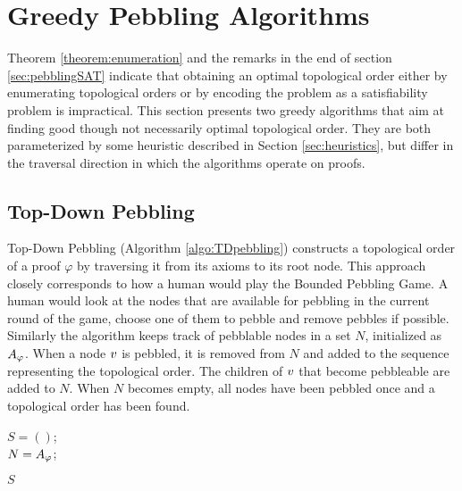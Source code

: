 \section{Greedy Pebbling Algorithms}
\label{sec:algorithms}

Theorem \ref{theorem:enumeration} and the remarks in the end of section \ref{sec:pebblingSAT} indicate that obtaining an optimal topological order either by enumerating topological orders or by encoding the problem as a satisfiability problem is impractical. 
This section presents two greedy algorithms that aim at finding good though not necessarily optimal topological order. 
They are both parameterized by some heuristic described in Section \ref{sec:heuristics}, but differ in the traversal direction in which the algorithms operate on proofs.

\subsection{Top-Down Pebbling}

Top-Down Pebbling (Algorithm \ref{algo:TDpebbling}) constructs a topological order of a proof $\varphi$ by traversing it from its axioms to its root node.
This approach closely corresponds to how a human would play the Bounded Pebbling Game. 
A human would look at the nodes that are available for pebbling in the current round of the game, choose one of them to pebble and remove pebbles if possible.
Similarly the algorithm keeps track of pebblable nodes in a set $N$, initialized as $A_{\varphi}$.
When a node $v$ is pebbled, it is removed from $N$ and added to the sequence representing the topological order. The children of $v$ that become pebbleable are added to $N$.
When $N$ becomes empty, all nodes have been pebbled once and a topological order has been found.


\begin{algorithm}[h]
	
	$S = ()$;  \\
	$N = A_{\varphi}$; 
	
	
	\Return $S$\;
	
  \caption[.]{}
  \label{algo:TDpebbling}
\end{algorithm}

